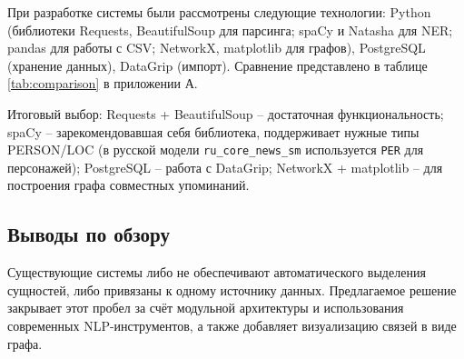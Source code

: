При разработке системы были рассмотрены следующие технологии: Python (библиотеки Requests, BeautifulSoup для парсинга; spaCy и Natasha для NER; pandas для работы с CSV; NetworkX, matplotlib для графов), PostgreSQL (хранение данных), DataGrip (импорт). Сравнение представлено в таблице \ref{tab:comparison} в приложении А.

Итоговый выбор: Requests + BeautifulSoup – достаточная функциональность; spaCy – зарекомендовавшая себя библиотека, поддерживает нужные типы PERSON/LOC (в русской модели \texttt{ru\_core\_news\_sm} используется \texttt{PER} для персонажей); PostgreSQL – работа с DataGrip; NetworkX + matplotlib – для построения графа совместных упоминаний.

\subsection{Выводы по обзору}

Существующие системы либо не обеспечивают автоматического выделения сущностей, либо привязаны к одному источнику данных. Предлагаемое решение закрывает этот пробел за счёт модульной архитектуры и использования современных NLP-инструментов, а также добавляет визуализацию связей в виде графа.